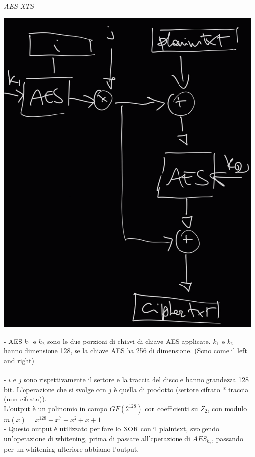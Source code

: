 \documentclass[11pt, oneside]{article}   	%
\begin{document}
\emph{AES-XTS}
\begin{center}
\includegraphics[scale= 0.4]{aesxts}\\
\end{center}
- AES $k_1$ e $k_2$ sono le due porzioni di chiavi di chiave AES applicate. $k_1$ e $k_2$ hanno dimensione 128, se la chiave AES ha 256 di dimensione. (Sono come il left and right)\\\\
- $i$ e $j$ sono rispettivamente il settore e la traccia del disco e hanno grandezza 128 bit. L'operazione che si svolge con $j$ è quella di prodotto (settore cifrato * traccia (non cifrata)). \\L'output è un polinomio in campo $GF(2^{128})$ con coefficienti su $Z_2$, con modulo $m(x) = x^{128}+x^7+x^2+x+1$\\
- Questo output è utilizzato per fare lo XOR con il plaintext, svolgendo un'operazione di whitening, prima di passare all'operazione di $AES_{k_2}$, passando per un whitening ulteriore abbiamo l'output.\\\\
\end{document}
